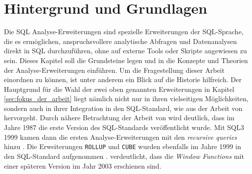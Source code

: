 \chapter{Hintergrund und Grundlagen}
\label{chap:hintergund_und_grundlagen} Die SQL Analyse-Erweiterungen sind spezielle
Erweiterungen der SQL-Sprache, die es ermöglichen, anspruchsvollere analytische Abfragen
und Datenanalysen direkt in SQL durchzuführen, ohne auf externe Tools oder
Skripte angewiesen zu sein. Dieses Kapitel soll die Grundsteine legen und in die
Konzepte und Theorien der Analyse-Erweiterungen einführen. Um die Fragestellung
dieser Arbeit einordnen zu können, ist unter anderem ein Blick auf die Historie hilfreich.
Der Hauptgrund für die Wahl der zwei oben genannten Erweiterungen in Kapitel
\ref{sec:fokus_der_arbeit} liegt nämlich nicht nur in ihren vielseitigen
Möglichkeiten, sondern auch in ihrer Integration in den SQL-Standard, wie aus
der Arbeit von \citet[S.~10]{grust2017advanced} hervorgeht. Durch nähere
Betrachtung der Arbeit von \cite{grust2017advanced} wird deutlich, dass im Jahre
1987 die erste Version des SQL-Standards veröffentlicht wurde. Mit SQL3 1999
kamen dann die ersten Analyse-Erweiterungen mit den \textit{recursive queries} hinzu
\citep[S.~10]{grust2017advanced}. Die Erweiterungen \texttt{ROLLUP} und \texttt{CUBE}
wurden ebenfalls im Jahre 1999 in den SQL-Standard aufgenommen \citep[Kapitel 9.12]{melton2001sql}.
\citet[S.~10]{grust2017advanced} verdeutlicht, dass die \textit{Window Functions}
mit einer späteren Version im Jahr 2003 erschienen sind.

